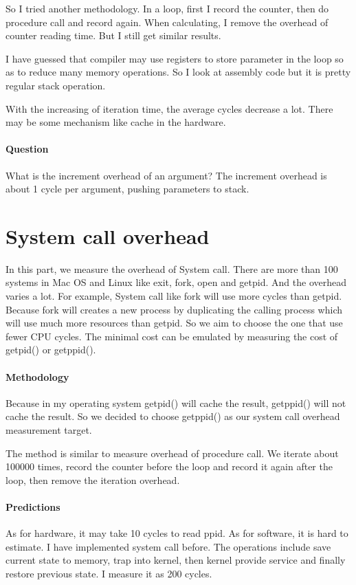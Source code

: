 So I tried another methodology. In a loop, first I record the counter, then do procedure call and record again. When calculating, I remove the overhead of counter reading time. But I still get similar results.

I have guessed that compiler may use registers to store parameter in the loop so as to reduce many memory operations. So I look at assembly code but it is pretty regular stack operation.

With the increasing of iteration time, the average cycles decrease a lot. There may be some mechanism like cache in the hardware.

\paragraph{Question} What is the increment overhead of an argument? The increment overhead is about 1 cycle per  argument, pushing parameters to stack.

\section{System call overhead}
In this part, we measure the overhead of System call. There are more than 100 systems in Mac OS and Linux like exit, fork, open and getpid. And the overhead varies a lot. For example, System call like fork will use more cycles than getpid. Because fork will creates a new process by duplicating the calling process which will use much more resources than getpid. So we aim to choose the one that use fewer CPU cycles. The minimal cost can be emulated by measuring the cost of getpid() or getppid().

\paragraph{Methodology}
Because in my operating system getpid() will cache the result, getppid() will not cache the result. So we decided to choose getppid() as our system call overhead measurement target.

The method is similar to measure overhead of procedure call. We iterate about 100000 times, record the counter before the loop and record it again after the loop, then remove the iteration overhead.

\paragraph{Predictions}
As for hardware, it may take 10 cycles to read ppid. As for software, it is hard to estimate. I have implemented system call before. The operations include save current state to memory, trap into kernel, then kernel provide service and finally restore previous state. I measure it as 200 cycles.


